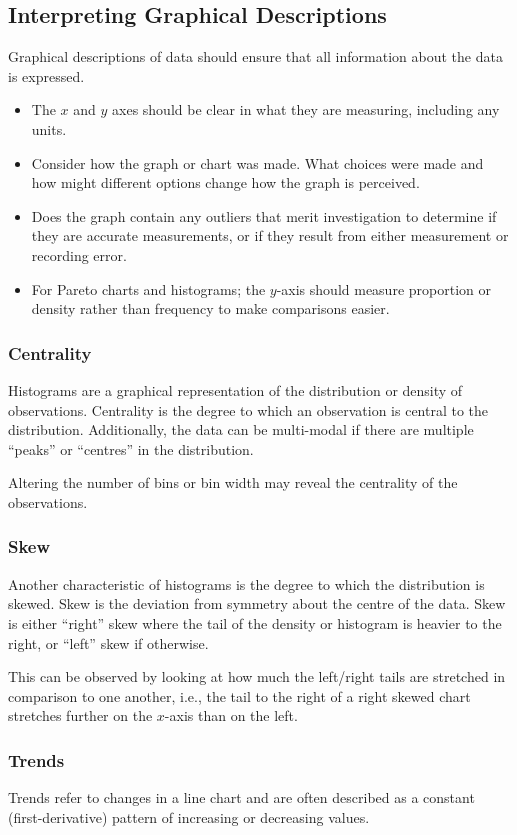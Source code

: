 \documentclass{article}
\begin{document}
\subsection{Interpreting Graphical Descriptions}
Graphical descriptions of data should ensure that all information about the data is expressed.
\begin{itemize}
    \item The \(x\) and \(y\) axes should be clear in what they are measuring, including any units.
    \item Consider how the graph or chart was made. What choices were made and how might different options change how the graph is perceived.
    \item Does the graph contain any outliers that merit investigation to determine if they are accurate measurements, or if they result from either measurement or recording error.
    \item For Pareto charts and histograms; the \(y\)-axis should measure proportion or density rather than frequency to make comparisons easier.
\end{itemize}
\subsubsection{Centrality}
Histograms are a graphical representation of the distribution or density of observations. Centrality is the degree to which an observation is central to the distribution. Additionally, the data can be multi-modal if there are multiple ``peaks'' or ``centres'' in the distribution.

Altering the number of bins or bin width may reveal the centrality of the observations.
\subsubsection{Skew}
Another characteristic of histograms is the degree to which the distribution is skewed. Skew is the deviation from symmetry about the centre of the data. Skew is either ``right'' skew where the tail of the density or histogram is heavier to the right, or ``left'' skew if otherwise.

This can be observed by looking at how much the left/right tails are stretched in comparison to one another, i.e., the tail to the right of a right skewed chart stretches further on the \(x\)-axis than on the left.
\subsubsection{Trends}
Trends refer to changes in a line chart and are often described as a
constant (first-derivative) pattern of increasing or decreasing values.
\end{document}
